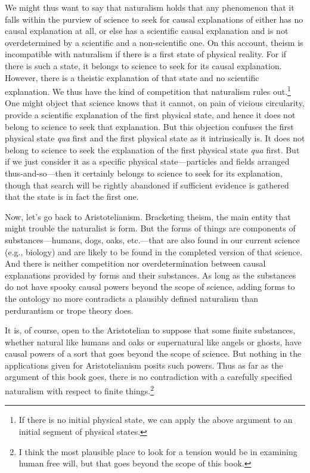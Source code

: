 We might thus want to say that naturalism holds that any phenomenon that it falls within the purview of science 
to seek for causal explanations of either has no causal explanation at all, or else has a scientific causal explanation 
and is not overdetermined by a scientific and a non-scientific one. On this account, theism is incompatible with
naturalism if there is a first state of physical reality. For if there is such a state, it belongs
to science to seek for its causal explanation. However, there is a theistic explanation of that state and no 
scientific explanation. We thus have the kind of competition that naturalism rules out.\footnote{If there is 
no initial physical state, we can apply the above argument to an initial
segment of physical states.} One might object that science knows that it cannot, on pain
of vicious circularity, provide a scientific explanation of the first physical state, and hence it does not belong to
science to seek that explanation. But this objection confuses the first physical state \textit{qua} first and the
first physical state as it intrinsically is. It does not belong to science to seek the explanation of the first physical
state \textit{qua} first. But if we just consider it as a specific physical state---particles and fields arranged thus-and-so---then
it certainly belongs to science to seek for its explanation, though that search will be rightly abandoned if sufficient evidence
is gathered that the state is in fact the first one.

Now, let's go back to Aristotelianism. Bracketing theism, the main entity that might trouble the naturalist is form.
But the forms of things are components of substances---humans, dogs, oaks, etc.---that are also found in our current
science (e.g., biology) and are likely to be found in the completed version of that science. And there is neither
competition nor overdetermination between causal explanations provided by
forms and their substances. As long as the substances do not have spooky causal powers beyond the scope of science,
adding forms to the ontology no more contradicts a plausibly defined naturalism than perdurantism or trope theory
does.

It is, of course, open to the Aristotelian to suppose that some finite substances, whether natural like humans and oaks 
or  supernatural like angels or ghosts, have causal powers of a sort that goes beyond the scope of science. But nothing in the applications given for Aristotelianism
posits such powers. Thus as far as the argument of this book goes, there is no contradiction with a carefully
specified naturalism with respect to finite things.\footnote{I think the most plausible place to look for a tension 
would be in examining human free will, but that goes beyond the scope of this book.}

